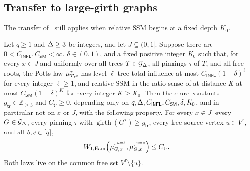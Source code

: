 \subsection{Transfer to large-girth graphs}

The transfer of~\cite{CLMM2023} still applies when relative SSM begins at a
fixed depth \(K_0\).

\begin{lemma}
\label{lem:hg-eventual-transfer}
Let \(q\ge1\) and \(\Deg\ge3\) be integers, and let \(J\subseteq(0,1]\).
Suppose there are
$0<C_{\mathsf{INFL}},C_{\mathsf{SM}}<\infty$, $\delta\in(0,1)$, and a fixed
positive integer $K_0$ such that, for every \(x\in J\) and uniformly over all
trees \(T\in\Gdeg\), all pinnings \(\tau\) of \(T\), and all free roots, the
Potts law \(\mupin{T}{\tau}{x}\) has level-\(\ell\) tree total influence at
most $C_{\mathsf{INFL}}(1-\delta)^\ell$ for every integer $\ell\ge1$, and
relative SSM in the ratio sense of \cite[Definition~5.7]{CLMM2023} at
distance $K$ at most $C_{\mathsf{SM}}(1-\delta)^K$ for every integer
$K\ge K_0$.  Then there are constants \(g_{\mathsf{tr}}\in\mathbb Z_{\ge3}\)
and \(C_{\mathsf{tr}}\ge0\), depending only on
\(q,\Deg,C_{\mathsf{INFL}},C_{\mathsf{SM}},\delta,K_0\), and in particular
not on \(x\) or \(J\), with the following property.  For every \(x\in J\),
every \(G\in\Gdeg\), every pinning \(\tau\) with
\(\operatorname{girth}(G^\tau)\ge g_{\mathsf{tr}}\), every free source vertex
\(u\in V^\tau\), and all \(b,c\in\colours\),
\begin{equation}
 \WHam\!\left(
   \mupin{G}{\tau^{u=b}}{x},
   \mupin{G}{\tau^{u=c}}{x}
 \right)\le C_{\mathsf{tr}}.
 \label{eq:hg-transfer-W1}
\end{equation}
Both laws live on the common free set \(V^\tau\setminus\{u\}\).
\end{lemma}

